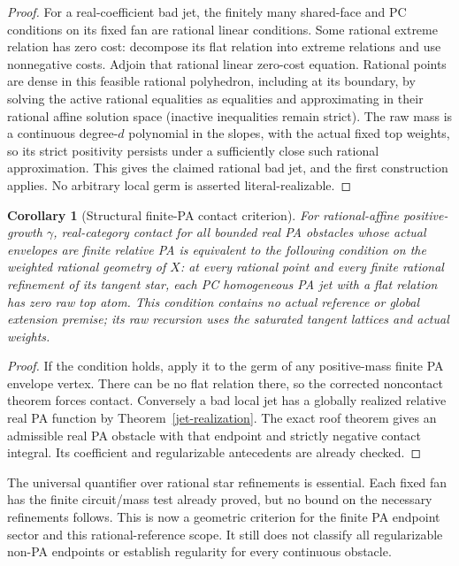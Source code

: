 \documentclass[11pt]{article}
\newtheorem{corollary}[theorem]{Corollary}
\begin{document}
\begin{proof}
For a real-coefficient bad jet, the finitely many shared-face and PC
conditions on its fixed fan are rational linear conditions. Some rational
extreme relation has zero cost: decompose its flat relation into extreme
relations and use nonnegative costs. Adjoin that rational linear
zero-cost equation. Rational points are dense in this feasible rational
polyhedron, including at its boundary, by solving the active rational
equalities as equalities and approximating in their rational affine
solution space (inactive inequalities remain strict). The raw mass is
a continuous degree-$d$ polynomial in the slopes, with the actual
fixed top weights, so its strict positivity persists under a sufficiently
close such rational approximation. This gives the claimed rational bad
jet, and the first construction applies. No arbitrary local germ is
asserted literal-realizable.
\end{proof}

\begin{corollary}[Structural finite-PA contact criterion]\label{local-finite}
For rational-affine positive-growth $\gamma$, real-category contact for
all bounded real PA obstacles whose actual envelopes are finite relative
PA is equivalent to the following condition on the weighted rational
geometry of $X$: at every rational point and every finite rational
refinement of its tangent star, each PC homogeneous PA jet with a flat
relation has zero raw top atom. This condition contains no actual
reference or global extension premise; its raw recursion uses the
saturated tangent lattices and actual weights.
\end{corollary}
\begin{proof}
If the condition holds, apply it to the germ of any positive-mass
finite PA envelope vertex. There can be no flat relation there, so the
corrected noncontact theorem forces contact. Conversely a bad local jet
has a globally realized relative real PA function by
Theorem~\ref{jet-realization}. The exact roof theorem gives an admissible
real PA obstacle with that endpoint and strictly negative contact integral.
Its coefficient and regularizable antecedents are already checked.
\end{proof}

The universal quantifier over rational star refinements is essential.
Each fixed fan has the finite circuit/mass test already proved, but no
bound on the necessary refinements follows. This is now a geometric
criterion for the finite PA endpoint sector and this rational-reference
scope. It still does not classify all regularizable non-PA endpoints or
establish regularity for every continuous obstacle.
\end{document}
